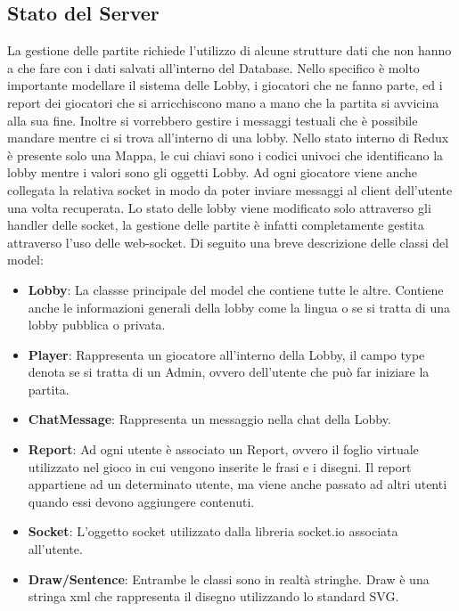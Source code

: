 \subsection{Stato del Server}
La gestione delle partite richiede l'utilizzo di alcune strutture dati che non hanno a che fare con i dati salvati all'interno del Database.
Nello specifico è molto importante modellare il sistema delle Lobby, i giocatori che ne fanno parte, ed i report dei giocatori che si arricchiscono mano a mano che la partita si avvicina alla sua fine. Inoltre si vorrebbero gestire i messaggi testuali che è possibile mandare mentre ci si trova all'interno di una lobby.\newline
Nello stato interno di Redux è presente solo una Mappa, le cui chiavi sono i codici univoci che identificano la lobby mentre i valori sono gli oggetti Lobby.\newline
Ad ogni giocatore viene anche collegata la relativa socket in modo da poter inviare messaggi al client dell'utente una volta recuperata.\newline
Lo stato delle lobby viene modificato solo attraverso gli handler delle socket, la gestione delle partite è infatti completamente gestita attraverso l'uso delle web-socket.\newline
Di seguito una breve descrizione delle classi del model:
\begin{itemize}
    \item \textbf{Lobby}: La classse principale del model che contiene tutte le altre. Contiene anche le informazioni generali della lobby come la lingua o se si tratta di una lobby pubblica o privata.
    \item \textbf{Player}: Rappresenta un giocatore all'interno della Lobby, il campo type denota se si tratta di un Admin, ovvero dell'utente che può far iniziare la partita.
    \item \textbf{ChatMessage}: Rappresenta un messaggio nella chat della Lobby.
    \item \textbf{Report}: Ad ogni utente è associato un Report, ovvero il foglio virtuale utilizzato nel gioco in cui vengono inserite le frasi e i disegni. Il report appartiene ad un determinato utente, ma viene anche passato ad altri utenti quando essi devono aggiungere contenuti.
    \item \textbf{Socket}: L'oggetto socket utilizzato dalla libreria socket.io associata all'utente.
    \item \textbf{Draw/Sentence}: Entrambe le classi sono in realtà stringhe. Draw è una stringa xml che rappresenta il disegno utilizzando lo standard SVG.
\end{itemize}

